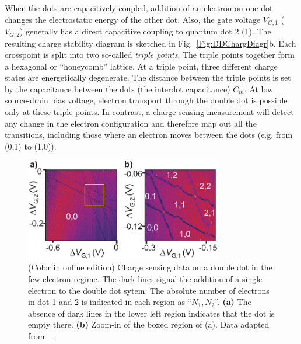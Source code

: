 \documentclass[12pt,aps,nofootinbib]{revtex4-1}
\begin{document}
When the dots are capacitively coupled, addition of an electron on
one dot changes the electrostatic energy of the other dot. Also,
the gate voltage $V_{G,1}$ ($V_{G,2}$) generally has a direct
capacitive coupling to quantum dot 2 (1). The resulting charge
stability diagram is sketched in Fig.~\ref{Fig:DDChargDiagr}b.
Each crosspoint is split into two so-called \textit{triple
points}. The triple points together form a hexagonal or
``honeycomb'' lattice. At a triple point, three different charge
states are energetically degenerate. The distance between the
triple points is set by the capacitance between the dots (the
interdot capacitance) $C_{m}$. At low source-drain bias voltage,
electron transport through the double dot is possible only at
these triple points. In contrast, a charge sensing measurement
will detect any change in the electron configuration and therefore
map out all the transitions, including those where an electron
moves between the dots (e.g. from (0,1) to (1,0)).

\begin{figure}[hbt]
\includegraphics[width=3.4in, clip=true]{hanson_fig28.eps}
\caption{(Color in online edition) Charge sensing data on a double dot in the few-electron
regime. The dark lines signal the addition of a single electron to
the double dot sytem. The absolute number of electrons in dot 1
and 2 is indicated in each region as ``$N_1,N_2$''. \textbf{(a)}
The absence of dark lines in the lower left region indicates that
the dot is empty there. \textbf{(b)} Zoom-in of the boxed region
of (a). Data adapted from ~\textcite{ElzermanPRB2003}.}
\label{fig:DDFewEl}
\end{figure}
\end{document}
